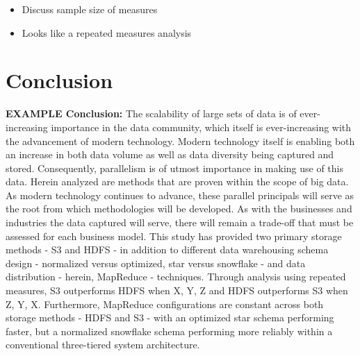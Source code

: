\documentclass[journal]{IEEEtran}
\begin{document}
\begin{itemize}
	\item Discuss sample size of measures
	\item Looks like a repeated measures analysis
\end{itemize}


\section{Conclusion}

\textbf{EXAMPLE Conclusion:}
The scalability of large sets of data is of ever-increasing importance in the data community, which itself is ever-increasing with the advancement of modern technology. Modern technology itself is enabling both an increase in both data volume as well as data diversity being captured and stored. Consequently, parallelism is of utmost importance in making use of this data. Herein analyzed are methods that are proven within the scope of big data. As modern technology continues to advance, these parallel principals will serve as the root from which methodologies will be developed. As with the businesses and industries the data captured will serve, there will remain a trade-off that must be assessed for each business model. This study has provided two primary storage methods - S3 and HDFS - in addition to different data warehousing schema design - normalized versus optimized, star versus snowflake - and data distribution - herein, MapReduce - techniques. Through analysis using repeated measures, S3 outperforms HDFS when X, Y, Z and HDFS outperforms S3 when Z, Y, X. Furthermore, MapReduce configurations are constant across both storage methods - HDFS and S3 - with an optimized star schema performing faster, but a normalized snowflake schema performing more reliably within a conventional three-tiered system architecture.

\ifCLASSOPTIONcaptionsoff
  \newpage
\fi
\end{document}
